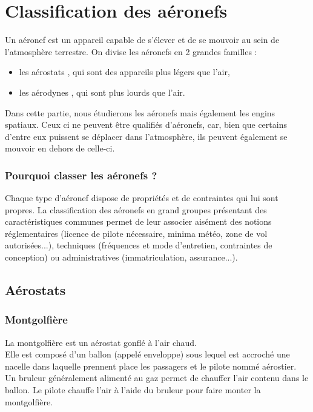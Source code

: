 \section{Classification des aéronefs}
Un \gls{aéronef}  est un appareil capable de s'élever et de se mouvoir au sein de l'atmosphère terrestre. On divise les aéronefs en 2 grandes familles :
\begin{itemize}
	\item les  \gls{aérostat}s , qui sont des appareils plus légers que l'air,
	\item les  \gls{aérodyne}s , qui sont plus lourds que l'air.
\end{itemize}

Dans cette partie, nous étudierons les aéronefs mais également les engins spatiaux. Ceux ci ne peuvent être qualifiés d'aéronefs, car, bien que certains d'entre eux puissent se déplacer dans l'atmosphère, ils peuvent également se mouvoir en dehors de celle-ci.

\subsubsection{Pourquoi classer les aéronefs ?}
Chaque type d'aéronef dispose de propriétés et de contraintes qui lui sont propres. La classification des aéronefs en grand groupes présentant des caractéristiques communes permet de leur associer aisément des notions réglementaires (licence de pilote nécessaire, minima météo, zone de vol autorisées...), techniques (fréquences et mode d'entretien, contraintes de conception) ou administratives (immatriculation, assurance...).

\subsection{Aérostats}
	\subsubsection{Montgolfière}
	La montgolfière  est un aérostat gonflé à l'air chaud. \\
	
	Elle est composé d'un ballon (appelé enveloppe) sous lequel est accroché une nacelle dans laquelle prennent place les passagers et le pilote nommé aérostier. Un bruleur généralement alimenté au gaz permet de chauffer l'air contenu dans le ballon. Le pilote chauffe l'air à l'aide du bruleur pour faire monter la montgolfière. \\
	
